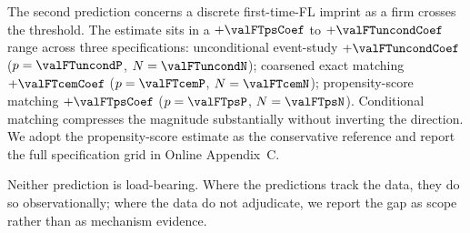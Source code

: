 

The second prediction concerns a discrete first-time-FL
imprint as a firm crosses the threshold. The estimate sits in a
$+\valFTpsCoef$ to $+\valFTuncondCoef$ range across three
specifications: unconditional event-study $+\valFTuncondCoef$
($p=\valFTuncondP$, $N=\valFTuncondN$); coarsened exact matching
$+\valFTcemCoef$ ($p=\valFTcemP$, $N=\valFTcemN$);
propensity-score matching $+\valFTpsCoef$ ($p=\valFTpsP$,
$N=\valFTpsN$). Conditional matching compresses the magnitude
substantially without inverting the direction. We adopt the
propensity-score estimate as the conservative reference and
report the full specification grid in Online Appendix~C.

Neither prediction is load-bearing. Where the predictions track
the data, they do so observationally; where the data do not
adjudicate, we report the gap as scope rather than as
mechanism evidence.
